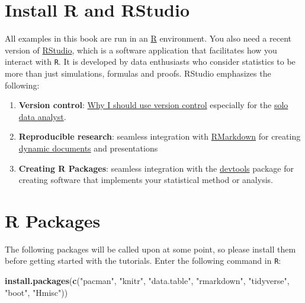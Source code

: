 \documentclass[]{book}
\makeatletter
\newenvironment{Shaded}{\begin{snugshade}}{\end{snugshade}}
\newcommand{\KeywordTok}[1]{\textcolor[rgb]{0.13,0.29,0.53}{\textbf{#1}}}
\newcommand{\StringTok}[1]{\textcolor[rgb]{0.31,0.60,0.02}{#1}}
\newcommand{\NormalTok}[1]{#1}
\newenvironment{kframe}{%
\medskip{}
\setlength{\fboxsep}{.8em}
 \def\at@end@of@kframe{}%
 \ifinner\ifhmode%
  \def\at@end@of@kframe{\end{minipage}}%
  \begin{minipage}{\columnwidth}%
 \fi\fi%
 \def\FrameCommand##1{\hskip\@totalleftmargin \hskip-\fboxsep
 \colorbox{shadecolor}{##1}\hskip-\fboxsep
     \hskip-\linewidth \hskip-\@totalleftmargin \hskip\columnwidth}%
 \MakeFramed {\advance\hsize-\width
   \@totalleftmargin\z@ \linewidth\hsize
   \@setminipage}}%
 {\par\unskip\endMakeFramed%
 \at@end@of@kframe}
\renewenvironment{Shaded}{\begin{kframe}}{\end{kframe}}
\theoremstyle{definition}
\theoremstyle{definition}
\theoremstyle{definition}
\theoremstyle{remark}
\makeatother
\begin{document}
\section*{Install R and RStudio}\label{install-r-and-rstudio}

All examples in this book are run in an
\href{https://cran.r-project.org/}{R} environment. You also need a
recent version of
\href{https://www.rstudio.com/products/rstudio/download/preview/}{RStudio},
which is a software application that facilitates how you interact with
\texttt{R}. It is developed by data enthusiasts who consider statistics
to be more than just simulations, formulas and proofs. RStudio
emphasizes the following:

\begin{enumerate}
\def\labelenumi{\arabic{enumi}.}
\item
  \textbf{Version control}:
  \href{http://stackoverflow.com/questions/1408450/why-should-i-use-version-control}{Why
  I should use version control} especially for the
  \href{http://stackoverflow.com/questions/2712421/r-and-version-control-for-the-solo-data-analyst}{solo
  data analyst}.
\item
  \textbf{Reproducible research}: seamless integration with
  \href{http://rmarkdown.rstudio.com/}{RMarkdown} for creating
  \href{http://yihui.name/knitr/}{dynamic documents} and presentations
\item
  \textbf{Creating R Packages}: seamless integration with the
  \href{https://github.com/hadley/devtools}{devtools} package for
  creating software that implements your statistical method or analysis.
\end{enumerate}

\section*{R Packages}\label{r-packages}

The following packages will be called upon at some point, so please
install them before getting started with the tutorials. Enter the
following command in \texttt{R}:

\begin{Shaded}
\begin{Highlighting}[]
\KeywordTok{install.packages}\NormalTok{(}\KeywordTok{c}\NormalTok{(}\StringTok{"pacman"}\NormalTok{, }\StringTok{"knitr"}\NormalTok{, }\StringTok{"data.table"}\NormalTok{, }\StringTok{"rmarkdown"}\NormalTok{, }\StringTok{"tidyverse"}\NormalTok{, }
    \StringTok{"boot"}\NormalTok{, }\StringTok{"Hmisc"}\NormalTok{))}
\end{Highlighting}
\end{Shaded}
\end{document}
